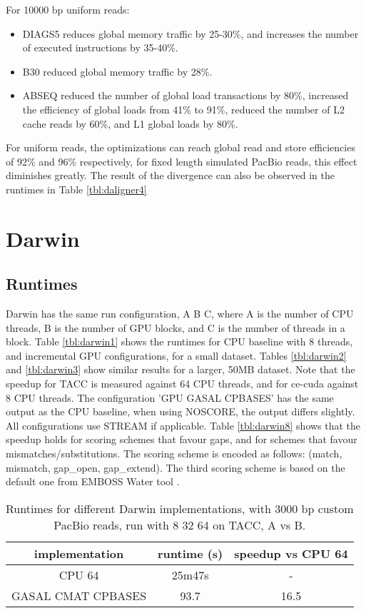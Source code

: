 \documentclass[../thesis.tex]{subfiles}
\begin{document}
For 10000 bp uniform reads:
\begin{itemize}
\item DIAGS5 reduces global memory traffic by 25-30\%, and increases the number of executed instructions by 35-40\%. \vspace{-10pt}
\item B30 reduced global memory traffic by 28\%. \vspace{-10pt}
\item ABSEQ reduced the number of global load transactions by 80\%, increased the efficiency of global loads from 41\% to 91\%, reduced the number of L2 cache reads by 60\%, and L1 global loads by 80\%.
\end{itemize}

For uniform reads, the optimizations can reach global read and store efficiencies of 92\% and 96\% respectively, for fixed length simulated PacBio reads, this effect diminishes greatly.
The result of the divergence can also be observed in the runtimes in Table \ref{tbl:daligner4}

\newpage

\section{Darwin}
\subsection{Runtimes}
Darwin has the same run configuration, A B C, where A is the number of CPU threads, B is the number of GPU blocks, and C is the number of threads in a block.
Table \ref{tbl:darwin1} shows the runtimes for CPU baseline with 8 threads, and incremental GPU configurations, for a small dataset.
Tables \ref{tbl:darwin2} and \ref{tbl:darwin3} show similar results for a larger, 50MB dataset.
Note that the speedup for TACC is measured against 64 CPU threads, and for ce-cuda against 8 CPU threads.
The configuration 'GPU GASAL CPBASES' has the same output as the CPU baseline, when using NOSCORE, the output differs slightly.
All configurations use STREAM if applicable.
Table \ref{tbl:darwin8} shows that the speedup holds for scoring schemes that favour gaps, and for schemes that favour mismatches/substitutions.
The scoring scheme is encoded as follows: (match, mismatch, gap\_open, gap\_extend).
The third scoring scheme is based on the default one from EMBOSS Water tool \cite{emboss}.

\begin{table}
\centering
\caption{Runtimes for different Darwin implementations, with 3000 bp custom PacBio reads, run with 8 32 64 on TACC, A vs B.}
\label{tbl:darwin0}
\begin{tabular}{c c c}
implementation & runtime (s) & speedup vs CPU 64 \\ \hline
CPU 64 & 25m47s & -\\
GASAL CMAT CPBASES & 93.7 & 16.5 \\
\end{tabular}
\end{table}
\end{document}
